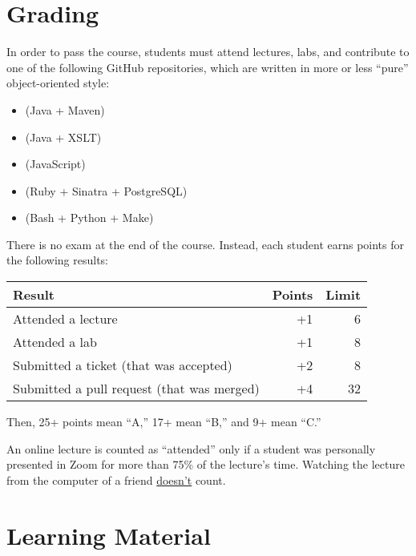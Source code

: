 \documentclass[nobrand,anonymous,nodate,nosecurity]{huawei}
\begin{document}
\newpage
\section*{Grading}

In order to pass the course, students must attend lectures, labs, and
contribute to one of the following GitHub repositories, which are written
in more or less ``pure'' object-oriented style:

\begin{itemize}
    \item \href{https://github.com/yegor256/cactoos}{} (Java + Maven)
    \item \href{https://github.com/yegor256/takes}{} (Java + XSLT)
    \item \href{https://github.com/objectionary/eo2js}{} (JavaScript)
    \item \href{https://github.com/zerocracy/baza}{} (Ruby + Sinatra + PostgreSQL)
    \item \href{https://github.com/yegor256/cam}{} (Bash + Python + Make)
\end{itemize}

There is no exam at the end of the course. Instead,
each student earns points for the following results:\\
\renewcommand{\arraystretch}{1}
\begin{tabular}{lrr}
Result & Points & Limit \\
\hline
Attended a lecture & +1 & 6 \\
Attended a lab & +1 & 8 \\
Submitted a ticket (that was accepted) & +2 & 8 \\
Submitted a pull request (that was merged) & +4 & 32 \\
\end{tabular}

Then, 25+ points mean ``A,'' 17+ mean ``B,'' and 9+ mean ``C.''

An online lecture is counted as ``attended'' only if a student was personally
presented in Zoom for more than 75\% of the lecture's time. Watching the
lecture from the computer of a friend \ul{doesn't} count.

\newpage
\section*{Learning Material}
\end{document}
